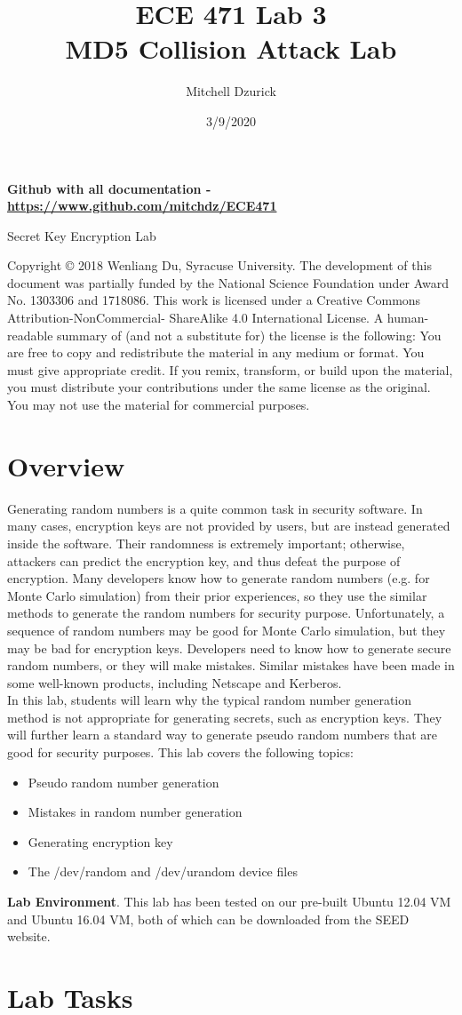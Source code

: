\documentclass[12pt]{article}
\title {{\bf ECE 471 Lab 3} \\
\large{MD5 Collision Attack Lab}}
\author{Mitchell Dzurick}
\date{3/9/2020}
\newcommand\tab[1][0.5cm]{\hspace*{#1}}
\begin{document}
\maketitle
\textbf{Github with all documentation - \url{https://www.github.com/mitchdz/ECE471}}
\tableofcontents 

\clearpage


Secret Key Encryption Lab

Copyright © 2018 Wenliang Du, Syracuse University. The development of this document was partially funded by the National
Science Foundation under Award No. 1303306 and 1718086. This work is licensed under a Creative Commons
Attribution-NonCommercial- ShareAlike 4.0 International License. A human-readable summary of (and not a substitute for)
the license is the following: You are free to copy and redistribute the material in any medium or format. You must give
appropriate credit. If you remix, transform, or build upon the material, you must distribute your contributions under the
same license as the original. You may not use the material for commercial purposes.

\section{Overview}

Generating random numbers is a quite common task in security software. In many cases, encryption keys
are not provided by users, but are instead generated inside the software. Their randomness is extremely
important; otherwise, attackers can predict the encryption key, and thus defeat the purpose of encryption.
Many developers know how to generate random numbers (e.g. for Monte Carlo simulation) from their
prior experiences, so they use the similar methods to generate the random numbers for security purpose.
Unfortunately, a sequence of random numbers may be good for Monte Carlo simulation, but they may be
bad for encryption keys. Developers need to know how to generate secure random numbers, or they will
make mistakes. Similar mistakes have been made in some well-known products, including Netscape and
Kerberos. \\
\tab In this lab, students will learn why the typical random number generation method is not appropriate
for generating secrets, such as encryption keys. They will further learn a standard way to generate pseudo
random numbers that are good for security purposes. This lab covers the following topics:


    \begin{itemize}
        \item Pseudo random number generation
        \item Mistakes in random number generation
        \item Generating encryption key
        \item The /dev/random and /dev/urandom device files
    \end{itemize}

\textbf{Lab Environment}. This lab has been tested on our pre-built Ubuntu 12.04 VM and Ubuntu 16.04 VM, both of which
can be downloaded from the SEED website.

\clearpage

\section{Lab Tasks}
\end{document}
